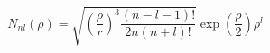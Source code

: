 \documentclass[border=2pt,varwidth]{standalone}
\begin{document}
\[
  N_{nl}(\rho) =
  \sqrt{\left (\frac{\rho}{r} \right )^3 \frac{(n-l-1)!}{2n(n+l)!}}
  \exp \left ( \frac{\rho}{2} \right )
  \rho^l
\]
\end{document}
